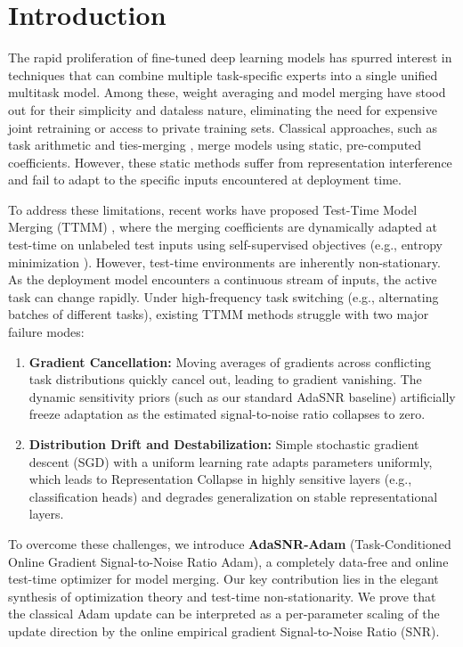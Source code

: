 \documentclass{article}
\theoremstyle{plain}
\theoremstyle{definition}
\theoremstyle{remark}
\begin{document}
\section{Introduction}
\label{sec:intro}
The rapid proliferation of fine-tuned deep learning models has spurred interest in techniques that can combine multiple task-specific experts into a single unified multitask model. Among these, weight averaging and model merging \cite{wortsman22modelsoups,ilharco22taskvectors,matena22fisher} have stood out for their simplicity and dataless nature, eliminating the need for expensive joint retraining or access to private training sets. Classical approaches, such as task arithmetic \cite{ilharco22taskvectors} and ties-merging \cite{yadav23tiesmerging}, merge models using static, pre-computed coefficients. However, these static methods suffer from representation interference and fail to adapt to the specific inputs encountered at deployment time.

To address these limitations, recent works have proposed Test-Time Model Merging (TTMM) \cite{yang23adamerging}, where the merging coefficients are dynamically adapted at test-time on unlabeled test inputs using self-supervised objectives (e.g., entropy minimization \cite{wang21tent}). However, test-time environments are inherently non-stationary. As the deployment model encounters a continuous stream of inputs, the active task can change rapidly. Under high-frequency task switching (e.g., alternating batches of different tasks), existing TTMM methods struggle with two major failure modes:
\begin{enumerate}
    \item \textbf{Gradient Cancellation:} Moving averages of gradients across conflicting task distributions quickly cancel out, leading to gradient vanishing. The dynamic sensitivity priors (such as our standard AdaSNR baseline) artificially freeze adaptation as the estimated signal-to-noise ratio collapses to zero.
    \item \textbf{Distribution Drift and Destabilization:} Simple stochastic gradient descent (SGD) with a uniform learning rate \cite{yang23adamerging} adapts parameters uniformly, which leads to Representation Collapse in highly sensitive layers (e.g., classification heads) and degrades generalization on stable representational layers.
\end{enumerate}

To overcome these challenges, we introduce \textbf{AdaSNR-Adam} (Task-Conditioned Online Gradient Signal-to-Noise Ratio Adam), a completely data-free and online test-time optimizer for model merging. Our key contribution lies in the elegant synthesis of optimization theory and test-time non-stationarity. We prove that the classical Adam update \cite{kingma14adam} can be interpreted as a per-parameter scaling of the update direction by the online empirical gradient Signal-to-Noise Ratio (SNR).
\end{document}
